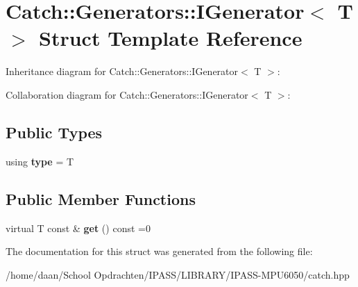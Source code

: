 \hypertarget{structCatch_1_1Generators_1_1IGenerator}{}\section{Catch\+:\+:Generators\+:\+:I\+Generator$<$ T $>$ Struct Template Reference}
\label{structCatch_1_1Generators_1_1IGenerator}


Inheritance diagram for Catch\+:\+:Generators\+:\+:I\+Generator$<$ T $>$\+:


Collaboration diagram for Catch\+:\+:Generators\+:\+:I\+Generator$<$ T $>$\+:
\subsection*{Public Types}
\begin{DoxyCompactItemize}
\item 
\mbox{\label{structCatch_1_1Generators_1_1IGenerator_a1f8677875fe0ff31f39c60d45504b9a5}} 
using {\bfseries type} = T
\end{DoxyCompactItemize}
\subsection*{Public Member Functions}
\begin{DoxyCompactItemize}
\item 
\mbox{\label{structCatch_1_1Generators_1_1IGenerator_a525d381fc9249a885b075a0632a8579a}} 
virtual T const  \& {\bfseries get} () const =0
\end{DoxyCompactItemize}


The documentation for this struct was generated from the following file\+:\begin{DoxyCompactItemize}
\item 
/home/daan/\+School Opdrachten/\+I\+P\+A\+S\+S/\+L\+I\+B\+R\+A\+R\+Y/\+I\+P\+A\+S\+S-\/\+M\+P\+U6050/catch.\+hpp\end{DoxyCompactItemize}
